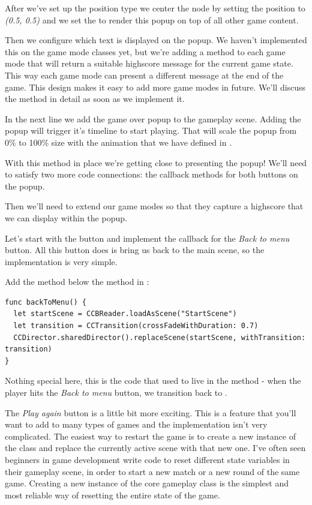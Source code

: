 After we've set up the position type we center the node by setting the position
to \textit{(0.5, 0.5)} and we set the  to render this popup
on top of all other game content.

Then we configure which text is displayed on the popup. We haven't implemented
this on the game mode classes yet, but we're adding a
 method to each game mode that will return a
suitable highscore message for the current game state. This way each game mode
can present a different message at the end of the game. This design makes it
easy to add more game modes in future. We'll discuss the
 method in detail as soon as we implement it.

In the next line we add the game over popup to the gameplay scene. Adding the
popup will trigger it's timeline to start playing. That will scale the popup
from 0\% to 100\% size with the animation that we have defined in \SB{}.

With this method in place we're getting close to presenting the popup! We'll
need to satisfy two more code connections: the callback methods for both
buttons on the popup.

Then we'll need to extend our game modes so that they capture a highscore that
we can display within the popup.

Let's start with the button and implement the callback for the \textit{Back to
menu} button. All this button does is bring us back to the main scene, so the
implementation is very simple.

\begin{leftbar}
Add the  method below the
 method in :
\begin{lstlisting}
func backToMenu() {
  let startScene = CCBReader.loadAsScene("StartScene")
  let transition = CCTransition(crossFadeWithDuration: 0.7)
  CCDirector.sharedDirector().replaceScene(startScene, withTransition: transition)
}
\end{lstlisting}
\end{leftbar}
Nothing special here, this is the code that used to live in the
 method - when the player hits the \textit{Back to
menu} button, we transition back to .

The \textit{Play again} button is a little bit more exciting. This is a feature
that you'll want to add to many types of games and the implementation isn't very
complicated. The easiest way to restart the game is to create a new instance of
the  class and replace the currently active scene with
that new one. I've often seen beginners in game development write code to reset
different state variables in their gameplay scene, in order to start a new match
or a new round of the same game. Creating a new instance of the core gameplay
class is the simplest and most reliable way of resetting the entire state of the
game.


